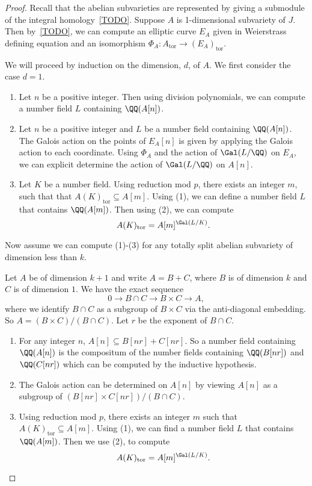 \documentclass{article}
\renewcommand{\tor}{\mathrm{tor}}
\begin{document}
\begin{proof}
    Recall that the abelian subvarieties are represented by giving a submodule
    of the integral homology~\ref{TODO}. Suppose $A$ is 1-dimensional subvariety of
    $J$. Then by~\ref{TODO}, we can compute an elliptic curve $E_A$ given in
    Weierstrass defining equation and an isomorphism $\Phi_A:A_\tor\to
    (E_A)_\tor$.

    We will proceed by induction on the dimension, $d$, of $A$. We first
    consider the case $d=1$. 
    \begin{enumerate}
        \item 
            Let $n$ be a positive integer. Then using division polynomials, we
            can compute a number field $L$ containing $\QQ(A[n])$.
        \item
            Let $n$ be a positive integer and $L$ be a number field containing
            $\QQ(A[n])$. The Galois action on the points of $E_A[n]$ is given
            by applying the Galois action to each coordinate. Using $\Phi_A$
            and the action of $\Gal(L/\QQ)$ on $E_A$, we can explicit determine
            the action of $\Gal(L/\QQ)$ on $A[n]$.
        \item
            Let $K$ be a number field. Using reduction mod $p$, there exists an
            integer $m$, such that that $A(K)_\tor \subseteq A[m]$. Using (1),
            we can define a number field $L$ that contains $\QQ(A[m])$. Then
            using (2), we can compute
            \[
                A(K)_\tor = A[m]^{\Gal(L/K)}.
            \]
    \end{enumerate}

    Now assume we can compute (1)-(3) for any totally split abelian subvariety
    of dimension less than $k$.

    Let $A$ be of dimension $k+1$ and write $A=B+C$, where $B$ is of
    dimension $k$ and $C$ is of dimension $1$.  We have the exact sequence
    \[
        0\to B\cap C \to B\times C \to A,
    \]
    where we identify $B\cap C$ as a subgroup of $B\times C$ via the
    anti-diagonal embedding. So $A=(B\times C)/(B\cap C)$. Let $r$ be the
    exponent of $B\cap C$. 
    \begin{enumerate}
        \item 
            For any integer $n$, $A[n] \subseteq B[nr]+C[nr]$. So a number
            field containing $\QQ(A[n])$ is the compositum  of the number
            fields containing $\QQ(B[nr])$ and $\QQ(C[nr])$ which can be
            computed by the inductive hypothesis.
        \item
            The Galois action can be determined on $A[n]$ by viewing $A[n]$ as
            a subgroup of $(B[nr]\times C[nr])/(B\cap C)$.
        \item
            Using reduction mod $p$, there exists an integer $m$ such that
            $A(K)_\tor\subseteq A[m]$. Using (1), we can find a number field
            $L$ that contains $\QQ(A[m])$. Then we use (2), to compute
            \[
                A(K)_\tor = A[m]^{\Gal(L/K)}.
            \]
    \end{enumerate}
\end{proof}
\end{document}
